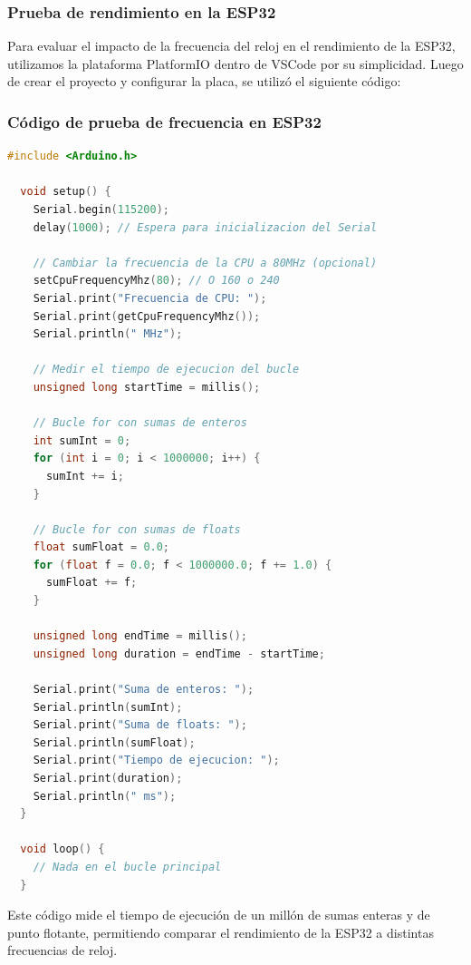 \bigskip

\subsubsection*{Prueba de rendimiento en la ESP32}

Para evaluar el impacto de la frecuencia del reloj en el rendimiento de la ESP32, utilizamos la plataforma PlatformIO dentro de VSCode por su simplicidad. Luego de crear el proyecto y configurar la placa, se utilizó el siguiente código:

\lstset{style=arduino}

\subsubsection*{Código de prueba de frecuencia en ESP32}

\begin{lstlisting}[language=C++, caption={Codigo para medir el tiempo de ejecucion en ESP32}, label=lst:esp32_code]
  #include <Arduino.h>
  
  void setup() {
    Serial.begin(115200);
    delay(1000); // Espera para inicializacion del Serial
  
    // Cambiar la frecuencia de la CPU a 80MHz (opcional)
    setCpuFrequencyMhz(80); // O 160 o 240
    Serial.print("Frecuencia de CPU: ");
    Serial.print(getCpuFrequencyMhz());
    Serial.println(" MHz");
  
    // Medir el tiempo de ejecucion del bucle
    unsigned long startTime = millis();
  
    // Bucle for con sumas de enteros
    int sumInt = 0;
    for (int i = 0; i < 1000000; i++) {
      sumInt += i;
    }
  
    // Bucle for con sumas de floats
    float sumFloat = 0.0;
    for (float f = 0.0; f < 1000000.0; f += 1.0) {
      sumFloat += f;
    }
  
    unsigned long endTime = millis();
    unsigned long duration = endTime - startTime;
  
    Serial.print("Suma de enteros: ");
    Serial.println(sumInt);
    Serial.print("Suma de floats: ");
    Serial.println(sumFloat);
    Serial.print("Tiempo de ejecucion: ");
    Serial.print(duration);
    Serial.println(" ms");
  }
  
  void loop() {
    // Nada en el bucle principal
  }
  \end{lstlisting}
  

Este código mide el tiempo de ejecución de un millón de sumas enteras y de punto flotante, permitiendo comparar el rendimiento de la ESP32 a distintas frecuencias de reloj.

